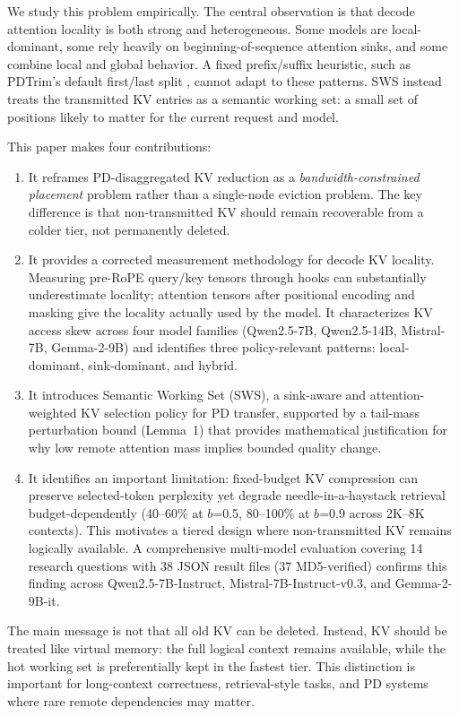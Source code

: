 \documentclass[11pt]{article}
\newcommand{\method}{SWS}
\newcommand{\fullmethod}{Semantic Working Set}
\newcommand{\pct}{\%}
\theoremstyle{definition}
\theoremstyle{plain}
\begin{document}
We study this problem empirically.  The central observation is that decode attention locality is both strong and heterogeneous.  Some models are local-dominant, some rely heavily on beginning-of-sequence attention sinks, and some combine local and global behavior.  A fixed prefix/suffix heuristic, such as PDTrim's default first/last split \citep{pdtrim}, cannot adapt to these patterns.  \method{} instead treats the transmitted KV entries as a semantic working set: a small set of positions likely to matter for the current request and model.

This paper makes four contributions:
\begin{enumerate}[leftmargin=1.5em,itemsep=2pt]
  \item It reframes PD-disaggregated KV reduction as a \emph{bandwidth-constrained placement} problem rather than a single-node eviction problem.  The key difference is that non-transmitted KV should remain recoverable from a colder tier, not permanently deleted.
  \item It provides a corrected measurement methodology for decode KV locality.  Measuring pre-RoPE query/key tensors through hooks can substantially underestimate locality; attention tensors after positional encoding and masking give the locality actually used by the model.  It characterizes KV access skew across four model families (Qwen2.5-7B, Qwen2.5-14B, Mistral-7B, Gemma-2-9B) and identifies three policy-relevant patterns: local-dominant, sink-dominant, and hybrid.
  \item It introduces \fullmethod{} (\method{}), a sink-aware and attention-weighted KV selection policy for PD transfer, supported by a tail-mass perturbation bound (Lemma~1) that provides mathematical justification for why low remote attention mass implies bounded quality change.
  \item It identifies an important limitation: fixed-budget KV compression can preserve selected-token perplexity yet degrade needle-in-a-haystack retrieval budget-dependently (40--60\pct{} at $b$=0.5, 80--100\pct{} at $b$=0.9 across 2K--8K contexts).  This motivates a tiered design where non-transmitted KV remains logically available.  A comprehensive multi-model evaluation covering 14 research questions with 38 JSON result files (37 MD5-verified) confirms this finding across Qwen2.5-7B-Instruct, Mistral-7B-Instruct-v0.3, and Gemma-2-9B-it.
\end{enumerate}

The main message is not that all old KV can be deleted.  Instead, KV should be treated like virtual memory: the full logical context remains available, while the hot working set is preferentially kept in the fastest tier.  This distinction is important for long-context correctness, retrieval-style tasks, and PD systems where rare remote dependencies may matter.
\end{document}
